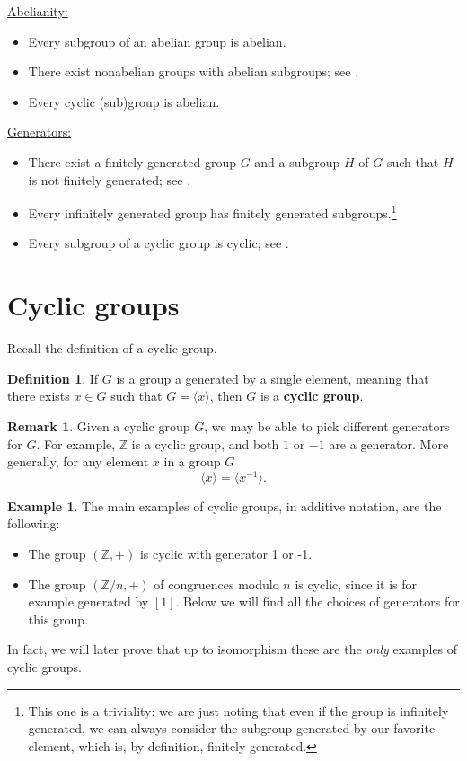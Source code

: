 \documentclass[12pt]{report}
\numberwithin{equation}{section}
\numberwithin{theorem}{chapter}
\theoremstyle{definition}
\newtheorem{definition}[theorem]{Definition}
\newtheorem{example}[theorem]{Example}
\newtheorem*{basic properties}{Basic Properties}
\newtheorem*{Important Remark}{Important Remark}
\newtheorem{remark}[theorem]{Remark}
\newcommand{\df}[1]{{\bf #1}\index{#1}}
\newcommand{\Z}{\mathbb{Z}}
\begin{document}
\underline{Abelianity:}
\vspace{-0.3em}
\begin{itemize}[itemsep=-0.2em]
\item Every subgroup of an abelian group is abelian. 
\item There exist nonabelian groups with abelian subgroups; see .
\item Every cyclic (sub)group is abelian.
\end{itemize}

\underline{Generators:}
\vspace{-0.3em}
\begin{itemize}[itemsep=-0.2em]
\item There exist a finitely generated group $G$ and a subgroup $H$ of $G$ such that $H$ is not finitely generated; see .
\item Every infinitely generated group has finitely generated subgroups.\footnote{This one is a triviality: we are just noting that even if the group is infinitely generated, we can always consider the subgroup generated by our favorite element, which is, by definition, finitely generated.}
\item Every subgroup of a cyclic group is cyclic; see . 
\end{itemize}



\section{Cyclic groups}

Recall the definition of a cyclic group.

\begin{definition}
If $G$ is a group a generated by a single element, meaning that there exists $x \in G$ such that $G = \langle x \rangle$, then $G$ is a \df{cyclic group}.
\end{definition}

\begin{remark}
Given a cyclic group $G$, we may be able to pick different generators for $G$. For example, $\Z$ is a cyclic group, and both $1$ or $-1$ are a generator. More generally, for any element $x$ in a group $G$
$$\langle x \rangle= \langle x^{-1}\rangle.$$
\end{remark}


\begin{example}
The main examples of cyclic groups, in additive notation, are the following:
\begin{itemize}
\item The group $(\Z,+)$ is cyclic with generator 1 or -1. 
\item The group $(\Z/n,+)$ of congruences modulo $n$ is cyclic, since it is for example generated by $[1]$. Below we will find all the choices of generators for this group.
\end{itemize}
In fact, we will later prove that up to isomorphism these are the {\em only} examples of cyclic groups.
\end{example}
\end{document}
